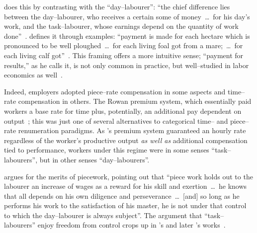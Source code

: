 \documentclass[trackingWork]{subfiles}
\begin{document}
\citeauthor{hughRaynbirdTaskWork} does this by contrasting with the ``day--labourer'':
``the chief difference lies between the day--labourer,
who receives a certain some of money~\dots~for his day's work,
and the task--labourer, whose earnings depend on the quantity of work done''~\cite{hughRaynbirdTaskWork}.
\citeauthor{10.2307/2338394} defines it through examples:
``payment is made for each hectare which is pronounced to be well ploughed~\dots~for each living foal got from a mare;~\dots~for each living calf got''~\cite{10.2307/2338394}.
This framing offers a more intuitive sense;
``payment for results,'' as he calls it,
is not only common in practice, but
well--studied in labor economics as well~\cite{Figlio2007901,weitzman1976new,10.2307/3003414,BJIR:BJIR038}.

Indeed, employers adopted piece--rate compensation in some aspects and
time--rate compensation in others.
The Rowan premium system,
which essentially paid workers
a base rate for time plus, potentially,
an additional pay dependent on output~\cite{rowan1901premium};
this was just one of several alternatives to categorical time-- and piece--rate renumeration paradigms.
As \citeauthor{rowan1901premium}'s premium system guaranteed an hourly rate
regardless of the worker's productive output
\textit{as well as} additional compensation tied to performance,
workers under this regime were
in some senses ``task--labourers'', but
in other senses ``day--labourers''.

\citeauthor{hughRaynbirdTaskWork} argues for the merits of piecework, %
pointing out that
``piece work holds out to the labourer an increase of wages as a reward for his skill and exertion~\dots~he knows that all depends on his own diligence and perseverance~\dots~[and] so long as he performs his work to the satisfaction of his master, he is not under that control to which the day--labourer is always subject''.
The argument that ``task--labourers'' enjoy freedom from control crops up in \citeauthor{hughRaynbirdTaskWork}'s and later \citeauthor{rowan1901premium}'s works~\cite{hughRaynbirdTaskWork,rowan1901premium}.
\end{document}

